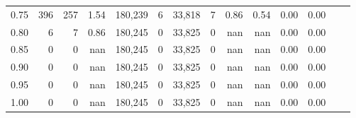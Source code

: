 \begin{tabular}{rrrrrrrrrrrrrr}
0.75 &     396 &    257 &    1.54 &  180,239 &        6 &  33,818 &       7 &  0.86 &  0.54 &  0.00 &      0.00 \\
0.80 &       6 &      7 &    0.86 &  180,245 &        0 &  33,825 &       0 &   nan &   nan &  0.00 &      0.00 \\
0.85 &       0 &      0 &     nan &  180,245 &        0 &  33,825 &       0 &   nan &   nan &  0.00 &      0.00 \\
0.90 &       0 &      0 &     nan &  180,245 &        0 &  33,825 &       0 &   nan &   nan &  0.00 &      0.00 \\
0.95 &       0 &      0 &     nan &  180,245 &        0 &  33,825 &       0 &   nan &   nan &  0.00 &      0.00 \\
1.00 &       0 &      0 &     nan &  180,245 &        0 &  33,825 &       0 &   nan &   nan &  0.00 &      0.00 \\
\bottomrule
\end{tabular}
